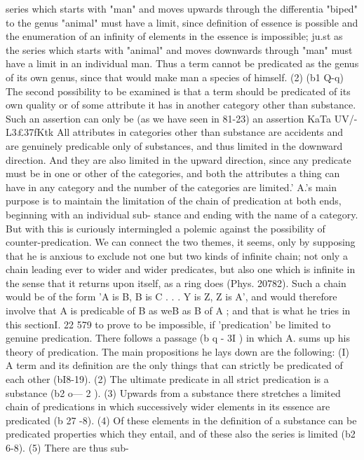 {{{{{{{{{{{{{{{{{{{{{{{{{{{{series which starts with "man" and moves upwards through the
differentia "biped" to the genus "animal" must have a limit,
since definition of essence is possible and the enumeration of an
infinity of elements in the essence is impossible; ju.st as the series
which starts with "animal" and moves downwards through
"man" must have a limit in an individual man. Thus a term
cannot be predicated as the genus of its own genus, since that
would make man a species of himself. (2) (b1 Q-q) The second
possibility to be examined is that a term should be predicated
of its own quality or of some attribute it has in another category
other than substance. Such an assertion can only be (as we have
seen in 81-23) an assertion KaTa UV/-L{3£{37fKtk All attributes in
categories other than substance are accidents and are genuinely
predicable only of substances, and thus limited in the downward
direction. And they are also limited in the upward direction,
since any predicate must be in one or other of the categories,
and both the attributes a thing can have in any category and the
number of the categories are limited.'
A.'s main purpose is to maintain the limitation of the chain
of predication at both ends, beginning with an individual sub-
stance and ending with the name of a category. But with this
is curiously intermingled a polemic against the possibility of
counter-predication. We can connect the two themes, it seems,
only by supposing that he is anxious to exclude not one but two
kinds of infinite chain; not only a chain leading ever to wider
and wider predicates, but also one which is infinite in the sense
that it returns upon itself, as a ring does (Phys. 20782). Such
a chain would be of the form 'A is B, B is C . . . Y is Z,
Z is A', and would therefore involve that A is predicable of
B as weB as B of A ; and that is what he tries in this sectionI. 22
579
to prove to be impossible, if 'predication' be limited to genuine
predication.
There follows a passage (b q - 3I ) in which A. sums up his theory
of predication. The main propositions he lays down are the
following: (I) A term and its definition are the only things that
can strictly be predicated of each other (bI8-19). (2) The ultimate
predicate in all strict predication is a substance (b2 o--- 2 ). (3)
Upwards from a substance there stretches a limited chain of
predications in which successively wider elements in its essence
are predicated (b 27 -8). (4) Of these elements in the definition of
a substance can be predicated properties which they entail, and
of these also the series is limited (b2 6-8). (5) There are thus sub-
}}}}}}}}}}}}}}}}}}}}}}}}}}}}}}
